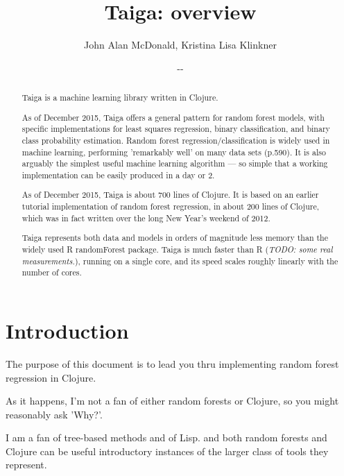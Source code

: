 \documentclass[11pt,openany,american,usenames,dvipsnames,svgnames,x11names,table,isodate]{article}
\numberwithin{equation}{section}
\numberwithin{figure}{section}
\renewcommand{\dateseparator}{-}
\renewcommand{\today}{\the\year \dateseparator \twodigit\month \dateseparator
 \twodigit\day}
\begin{document}
 

\title{Taiga: overview}
\author{John Alan McDonald, Kristina Lisa Klinkner}
\date{\today}
\maketitle

\begin{abstract}
Taiga\cite{taiga-2015} is a machine learning library written in
Clojure. 

As of December 2015, Taiga offers a general
pattern for random forest models, with specific implementations for least 
squares regression, binary classification, and binary class probability 
estimation. 
Random forest regression/classification is widely used in machine learning, 
performing 'remarkably well' on many data sets 
(p.590\cite{hastie-tibshirani-friedman-2009}).
It is also arguably the simplest useful machine learning algorithm
--- so simple that a working implementation can be easily produced
in a day or 2. 

As of December 2015, Taiga is about 700 lines of Clojure.
It is based on an earlier tutorial implementation of random forest
regression, in about 200 lines of Clojure, which was in fact written
over the long New Year's weekend of 2012\cite{rfrk-video-2012}.

Taiga represents both data and models in orders of
magnitude less memory than the widely used R
randomForest\cite{r-randomForest} package.
Taiga is much faster than R (\textit{TODO: some real measurements.}), 
running on a single core, and its speed scales roughly linearly with the
number of cores.
\end{abstract}
\newpage{}

\tableofcontents{}
\newpage{}


\section{Introduction}

The purpose of this document is to lead you thru implementing random
forest regression in Clojure. 

As it happens, I'm not a fan of either random forests or Clojure,
so you might reasonably ask 'Why?'. 

I am a fan of tree-based methods and of Lisp. and both random forests
and Clojure can be useful introductory instances of the larger class
of tools they represent. 
\end{document}

